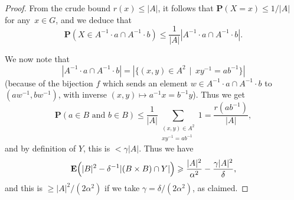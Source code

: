 \documentclass[12pt]{amsart}
\renewcommand{\leq}{\leqslant}
\renewcommand{\geq}{\geqslant}
\numberwithin{equation}{section}
\newcommand{\proba}{\mathbf{P}}
\newcommand{\expect}{\mathbf{E}}
\theoremstyle{plain}
\theoremstyle{remark}
\theoremstyle{definition}
\renewcommand{\geq}{\geqslant}
\renewcommand{\leq}{\leqslant}
\begin{document}
\begin{proof}
  From the crude bound $r(x)\leq |A|$, it follows that
  $\proba(X=x)\leq 1/|A|$ for any~$x\in G$, and we deduce that
  $$
  \proba(X\in A^{-1}\cdot a\cap A^{-1}\cdot b)\leq \frac{1}{|A|}
  |A^{-1}\cdot a\cap A^{-1}\cdot b|.
  $$
  
  We now note that
  $$
  |A^{-1}\cdot a\cap A^{-1}\cdot b|=|\{(x,y)\in A^2\,\mid\,
  xy^{-1}=ab^{-1}\}|
  $$
  (because of the bijection $f$ which sends an element
  $w\in A^{-1}\cdot a\cap A^{-1}\cdot b$ to $(aw^{-1},bw^{-1})$, with
  inverse $(x,y)\mapsto a^{-1}x=b^{-1}y$).  Thus we get
  $$
  \proba(a\in B\text{ and } b\in B) \leq
  \frac{1}{|A|}\sum_{\substack{(x,y)\in
      A^2\\xy^{-1}=ab^{-1}}}1=\frac{r(ab^{-1})}{|A|},
  $$
  and by definition of $Y$, this is $<\gamma |A|$.
  Thus we have
  $$
  \expect\Bigl( |B|^2 -\delta^{-1}|(B\times B)\cap Y| \Bigr)\geq
  \frac{|A|^2}{\alpha^2}-\frac{\gamma |A|^2}{\delta},
  $$
  and this is $\geq |A|^2/(2\alpha^2)$ if we take
  $\gamma=\delta/(2\alpha^2)$, as claimed.
\end{proof}
\end{document}
